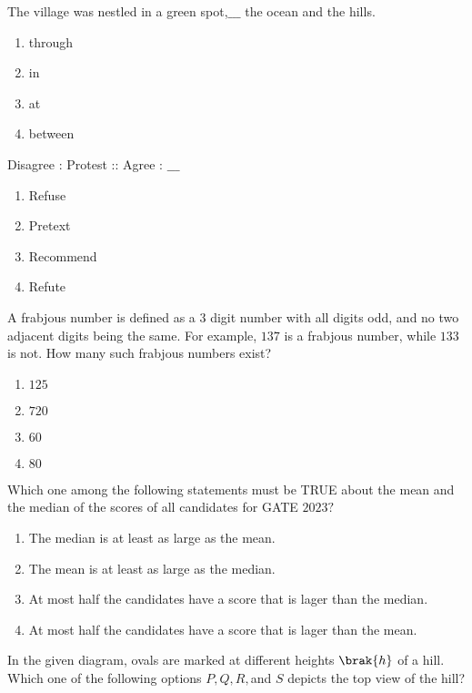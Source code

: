 \iffalse
    \author{EE24BTECH11029}
    \section{ma}
    \chapter{2023}
\fi


\item The village was nestled in a green spot,$\_\_\_$ the ocean and the hills.
    \begin{enumerate}
        \item through
        \item in
        \item at
        \item between
    \end{enumerate}
    \item Disagree : Protest :: Agree : $\_\_\_$
    \begin{enumerate}
        \item Refuse
        \item Pretext
        \item Recommend
        \item Refute
    \end{enumerate}
    \item A frabjous number is defined as a $3$ digit number with all digits odd, and no two adjacent digits being the same. For example, $137$ is a frabjous number, while $133$ is not. How many such frabjous numbers exist?
    \begin{enumerate}
        \item $125$
        \item $720$
        \item  $60$
        \item $80$
    \end{enumerate}
    \item Which one among the following statements must be TRUE about the mean and the median of the scores of all candidates for GATE $2023?$
    \begin{enumerate}
        \item The median is at least as large as the mean.
        \item The mean is at least as large as the median.
        \item At most half the candidates have a score that is lager than the median.
        \item At most half the candidates have a score that is lager than the mean.
    \end{enumerate}
    \item In the given diagram, ovals are marked at different heights $\brak{h}$ of a hill. Which one of the following options $P, Q, R, $and $S$ depicts the top view of the hill?

